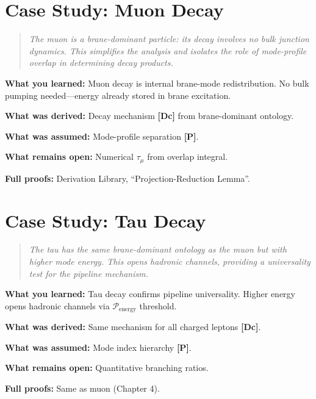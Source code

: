 \documentclass[11pt,a4paper]{book}
\theoremstyle{definition}
\theoremstyle{remark}
\newcommand{\tagDc}{\textcolor{calibratedColor}{\textbf{[Dc]}}}
\newcommand{\tagP}{\textcolor{postulatedColor}{\textbf{[P]}}}
\begin{document}
\chapter{Case Study: Muon Decay}
\label{ch:case_muon}

\begin{quote}
\textit{The muon is a brane-dominant particle: its decay involves no bulk junction
dynamics. This simplifies the analysis and isolates the role of mode-profile
overlap in determining decay products.}
\end{quote}



\begin{chapterRecap}
\textbf{What you learned:} Muon decay is internal brane-mode redistribution.
No bulk pumping needed---energy already stored in brane excitation.

\textbf{What was derived:} Decay mechanism \tagDc{} from brane-dominant ontology.

\textbf{What was assumed:} Mode-profile separation \tagP{}.

\textbf{What remains open:} Numerical $\tau_\mu$ from overlap integral.

\textbf{Full proofs:} Derivation Library, ``Projection-Reduction Lemma''.
\end{chapterRecap}

\chapter{Case Study: Tau Decay}
\label{ch:case_tau}

\begin{quote}
\textit{The tau has the same brane-dominant ontology as the muon but with higher
mode energy. This opens hadronic channels, providing a universality test for the
pipeline mechanism.}
\end{quote}



\begin{chapterRecap}
\textbf{What you learned:} Tau decay confirms pipeline universality. Higher energy
opens hadronic channels via $\mathcal{P}_{\text{energy}}$ threshold.

\textbf{What was derived:} Same mechanism for all charged leptons \tagDc{}.

\textbf{What was assumed:} Mode index hierarchy \tagP{}.

\textbf{What remains open:} Quantitative branching ratios.

\textbf{Full proofs:} Same as muon (Chapter 4).
\end{chapterRecap}
\end{document}
